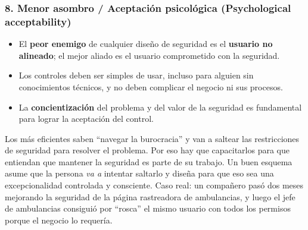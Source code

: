 \documentclass[../main.tex]{subfiles}
\begin{document}
\begin{center}
\end{center}

\subsubsection{8. Menor asombro / Aceptación psicológica (Psychological acceptability)}
\begin{itemize}
  \item El \textbf{peor enemigo} de cualquier diseño de seguridad es el \textbf{usuario no alineado}; el mejor aliado es el usuario comprometido con la seguridad.
  \item Los controles deben ser simples de usar, incluso para alguien sin conocimientos técnicos, y no deben complicar el negocio ni sus procesos.
  \item La \textbf{concientización} del problema y del valor de la seguridad es fundamental para lograr la aceptación del control.
\end{itemize}

\begin{destacado}
 Los más eficientes saben ``navegar la burocracia'' y van a saltear las restricciones de seguridad para resolver el problema. Por eso hay que capacitarlos para que entiendan que mantener la seguridad es parte de su trabajo. Un buen esquema asume que la persona \emph{va a} intentar saltarlo y diseña para que eso sea una excepcionalidad controlada y consciente. Caso real: un compañero pasó dos meses mejorando la seguridad de la página rastreadora de ambulancias, y luego el jefe de ambulancias consiguió por ``rosca'' el mismo usuario con todos los permisos porque el negocio lo requería.
\end{destacado}
\end{document}
